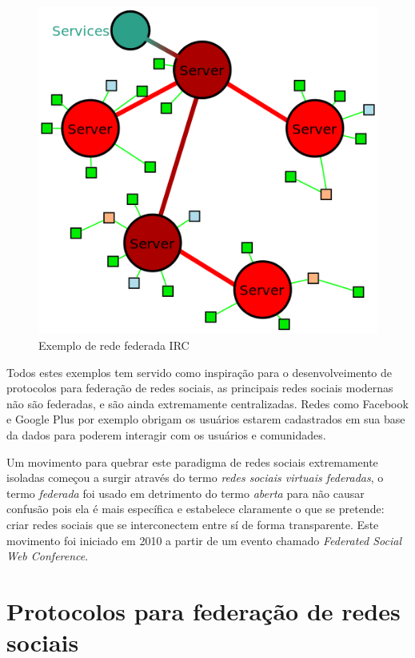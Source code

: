 \documentclass[12pt]{article}
\begin{document}
\begin{figure}[h]
\center
\includegraphics[scale=0.4]{Ircnetz-Schema.png}
\caption{Exemplo de rede federada IRC}
\label{irc}
\end{figure}

Todos estes exemplos tem servido como inspiração para o desenvolveimento de
protocolos para federação de redes sociais, as principais redes sociais
modernas não são federadas, e são ainda extremamente centralizadas. Redes como
Facebook e Google Plus por exemplo obrigam os usuários estarem cadastrados em
sua base da dados para poderem interagir com os usuários e comunidades.

Um movimento para quebrar este paradigma de redes sociais extremamente
isoladas começou a surgir através do termo {\it redes sociais virtuais
federadas}, o termo {\it federada} foi usado em detrimento do termo {\it
aberta} para não causar confusão pois ela é mais específica e estabelece
claramente o que se pretende: criar redes sociais que se interconectem entre
sí de forma transparente. Este movimento foi iniciado em 2010 a partir de um
evento chamado {\it Federated Social Web Conference}\cite{aurelio}.

\section{Protocolos para federação de redes sociais}
\end{document}
